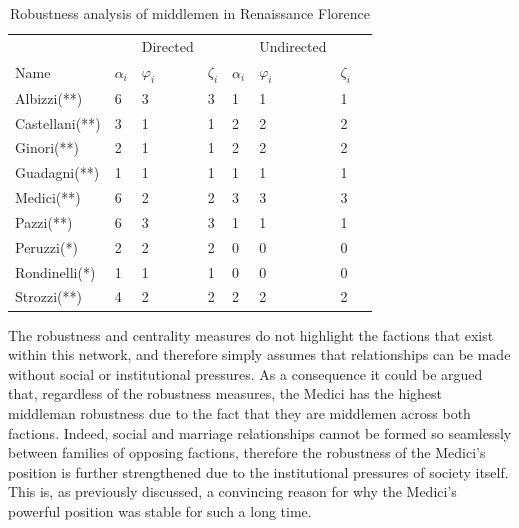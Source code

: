 \documentclass[11pt,fleqn]{article}
\begin{document}
\begin{table}[]
\centering
\begin{tabu} to \textwidth {X[l]  X[c]  X[c]  X[c] || X[c]  X[c]  X[c]  X[c]} 
\hline \hline
               &              & Directed    &              &              & Undirected  &              \\
Name           & $\alpha_{i}$ & $\varphi_{i}$ & $\zeta_{i}$ & $\alpha_{i}$ & $\varphi_{i}$ & $\zeta_{i}$ \\ \hline
Albizzi(**)    & 6            & 3           & 3            & 1            & 1           & 1            \\
Castellani(**) & 3            & 1           & 1            & 2            & 2           & 2            \\
Ginori(**)     & 2            & 1           & 1            & 2            & 2           & 2            \\
Guadagni(**)   & 1            & 1           & 1            & 1            & 1           & 1            \\
Medici(**)     & 6            & 2           & 2            & 3            & 3           & 3            \\
Pazzi(**)      & 6            & 3           & 3            & 1            & 1           & 1            \\
Peruzzi(*)     & 2            & 2           & 2            & 0            & 0           & 0            \\
Rondinelli(*)  & 1            & 1           & 1            & 0            & 0           & 0            \\
Strozzi(**)    & 4            & 2           & 2            & 2            & 2           & 2            \\ \hline
\end{tabu}
\caption{Robustness analysis of middlemen in Renaissance Florence}
\label{FlorenceRobust}
\end{table}

The robustness and centrality measures do not highlight the factions that exist within this network, and therefore simply assumes that relationships can be made without social or institutional pressures. As a consequence it could be argued that, regardless of the robustness measures, the Medici has the highest middleman robustness due to the fact that they are middlemen across both factions. Indeed, social and marriage relationships cannot be formed so seamlessly between families of opposing factions, therefore the robustness of the Medici's position is further strengthened due to the institutional pressures of society itself. This is, as previously discussed, a convincing reason for why the Medici's powerful position was stable for such a long time.
\end{document}
